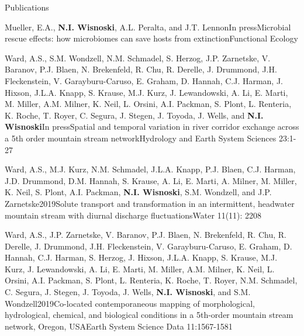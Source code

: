 \documentclass{resume} %
\begin{document}
\begin{rhangSection}{Publications}

\begin{Publication}{Mueller, E.A., {\bf N.I. Wisnoski}, A.L. Peralta, and J.T. Lennon}{In press}{Microbial rescue effects: how microbiomes can save hosts from extinction}{Functional Ecology}
\end{Publication}

\begin{Publication}{Ward, A.S., S.M. Wondzell, N.M. Schmadel, S. Herzog, J.P. Zarnetske, V. Baranov, P.J. Blaen, N. Brekenfeld, R. Chu, R. Derelle, J. Drummond, J.H. Fleckenstein, V. Garayburu-Caruso, E. Graham, D. Hannah, C.J. Harman, J. Hixson, J.L.A. Knapp, S. Krause, M.J. Kurz, J. Lewandowski, A. Li, E. Marti, M. Miller, A.M. Milner, K. Neil, L. Orsini, A.I. Packman, S. Plont, L. Renteria, K. Roche, T. Royer, C. Segura, J. Stegen, J. Toyoda, J. Wells, and {\bf N.I. Wisnoski}}{In press}{Spatial and temporal variation in river corridor exchange across a 5th order mountain stream network}{Hydrology and Earth System Sciences 23:1-27} 
\end{Publication}

\begin{Publication}{Ward, A.S., M.J. Kurz, N.M. Schmadel, J.L.A. Knapp, P.J. Blaen, C.J. Harman, J.D. Drummond, D.M. Hannah, S. Krause, A. Li, E. Marti, A. Milner, M. Miller, K. Neil, S. Plont, A.I. Packman, {\bf N.I. Wisnoski}, S.M. Wondzell, and J.P. Zarnetske}{2019}{Solute transport and transformation in an intermittent, headwater mountain stream with diurnal discharge fluctuations}{Water 11(11): 2208}
\end{Publication}

\begin{Publication}{Ward, A.S., J.P. Zarnetske, V. Baranov, P.J. Blaen, N. Brekenfeld, R. Chu, R. Derelle, J. Drummond, J.H. Fleckenstein, V. Garayburu-Caruso, E. Graham, D. Hannah, C.J. Harman, S. Herzog, J. Hixson, J.L.A. Knapp, S. Krause, M.J. Kurz, J. Lewandowski, A. Li, E. Marti, M. Miller, A.M. Milner, K. Neil, L. Orsini, A.I. Packman, S. Plont, L. Renteria, K. Roche, T. Royer, N.M. Schmadel, C. Segura, J. Stegen, J. Toyoda, J. Wells, {\bf N.I. Wisnoski}, and S.M. Wondzell}{2019}{Co-located contemporaneous mapping of morphological, hydrological, chemical, and biological conditions in a 5th-order mountain stream network, Oregon, USA}{Earth System Science Data 11:1567-1581}
\end{Publication}


\end{rhangSection}
\end{document}
